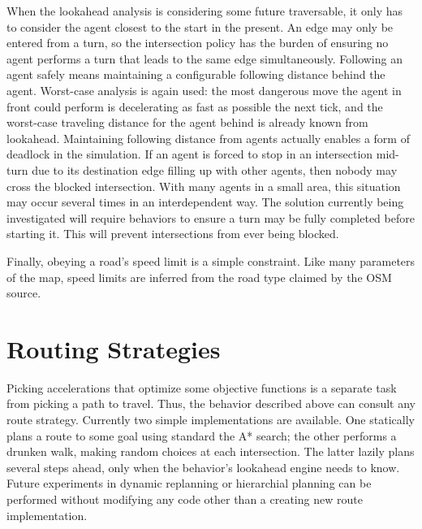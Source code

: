 \documentclass[letterpaper, 10 pt, conference]{ieeeconf}  %
\begin{document}
When the lookahead analysis is considering some future traversable, it only has
to consider the agent closest to the start in the present. An edge may only be
entered from a turn, so the intersection policy has the burden of ensuring no
agent performs a turn that leads to the same edge simultaneously. Following an
agent safely means maintaining a configurable following distance behind the
agent. Worst-case analysis is again used: the most dangerous move the agent in
front could perform is decelerating as fast as possible the next tick, and the
worst-case traveling distance for the agent behind is already known from
lookahead. Maintaining following distance from agents actually enables a form of
deadlock in the simulation. If an agent is forced to stop in an intersection
mid-turn due to its destination edge filling up with other agents, then nobody
may cross the blocked intersection. With many agents in a small area, this
situation may occur several times in an interdependent way. The solution
currently being investigated will require behaviors to ensure a turn may be
fully completed before starting it. This will prevent intersections from ever
being blocked.

Finally, obeying a road's speed limit is a simple constraint. Like many
parameters of the map, speed limits are inferred from the road type claimed by
the OSM source.



\section{Routing Strategies}

Picking accelerations that optimize some objective functions is a separate task
from picking a path to travel. Thus, the behavior described above can consult
any route strategy. Currently two simple implementations are available. One
statically plans a route to some goal using standard the A* search; the other
performs a drunken walk, making random choices at each intersection. The latter
lazily plans several steps ahead, only when the behavior's lookahead engine
needs to know. Future experiments in dynamic replanning or hierarchial planning
can be performed without modifying any code other than a creating new route
implementation.
\end{document}
